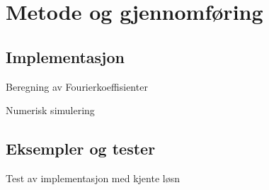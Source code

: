 \section{Metode og gjennomføring}

\subsection{Implementasjon}

Beregning av Fourierkoeffisienter

Numerisk simulering

\subsection{Eksempler og tester }
Test av implementasjon med kjente løsn
